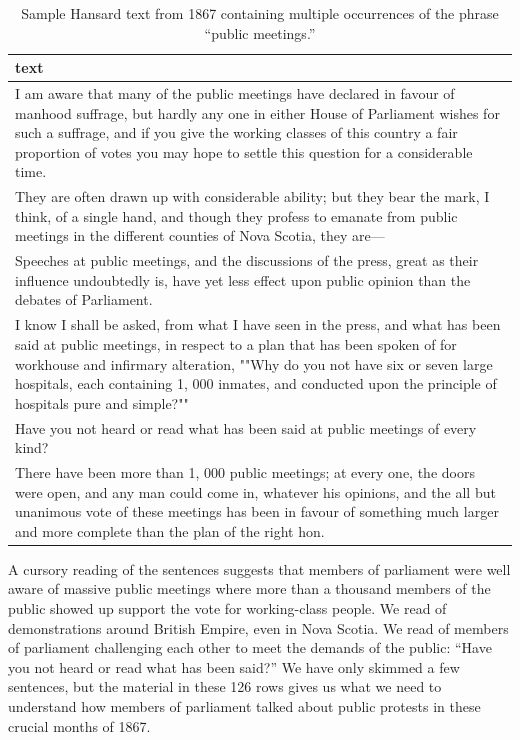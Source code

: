 \documentclass[
]{article}
\begin{document}
\begin{longtable}[t]{>{\raggedright\arraybackslash}p{14cm}}
\caption{\label{tab:unnamed-chunk-18}Sample Hansard text from 1867 containing multiple occurrences 
        of the phrase “public meetings.”}\\
\toprule
text\\
\midrule
I am aware that many of the public meetings have declared in favour of manhood
suffrage, but hardly any one in either House of Parliament wishes for such a
suffrage, and if you give the working classes of this country a fair proportion
of votes you may hope to settle this question for a considerable time.\\
They are often drawn up with considerable ability; but they bear the mark, I
think, of a single hand, and though they profess to emanate from public meetings
in the different counties of Nova Scotia, they are—\\
Speeches at public meetings, and the discussions of the press, great as their
influence undoubtedly is, have yet less effect upon public opinion than the
debates of Parliament.\\
I know I shall be asked, from what I have seen in the press, and what has
been said at public meetings, in respect to a plan that has been spoken of for
workhouse and infirmary alteration, ""Why do you not have six or seven large
hospitals, each containing 1, 000 inmates, and conducted upon the principle of
hospitals pure and simple?""\\
Have you not heard or read what has been said at public meetings of every kind?\\
\addlinespace
There have been more than 1, 000 public meetings; at every one, the doors
were open, and any man could come in, whatever his opinions, and the all but
unanimous vote of these meetings has been in favour of something much larger and
more complete than the plan of the right hon.\\
\bottomrule
\end{longtable}

A cursory reading of the sentences suggests that members of parliament
were well aware of massive public meetings where more than a thousand
members of the public showed up support the vote for working-class
people. We read of demonstrations around British Empire, even in Nova
Scotia. We read of members of parliament challenging each other to meet
the demands of the public: ``Have you not heard or read what has been
said?'' We have only skimmed a few sentences, but the material in these
126 rows gives us what we need to understand how members of parliament
talked about public protests in these crucial months of 1867.
\end{document}
